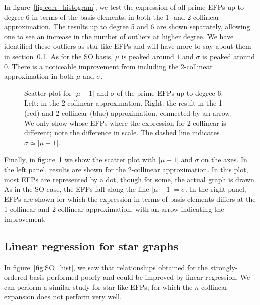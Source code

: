 \documentclass[a4paper,11pt]{article}
\renewcommand{\sec}[1]{section~\ref{sec:#1}}
\newcommand{\fig}[1]{figure~\ref{fig:#1}}
\begin{document}
In \fig{corr_histogram}, we test the expression of all prime EFPs up to degree 6 in terms of the basis elements, in both the 1- and 2-collinear approximation.
     The results up to degree 5 and 6 are shown separately, allowing one to see an increase in the number of outliers at higher degree.
     We have identified these outliers as star-like EFPs and will have more to say about them in \sec{star}.
     As for the SO basis, $\mu$ is peaked around $1$ and $\sigma$ is peaked around 0.
     There is a noticeable improvement from including the 2-collinear approximation in both $\mu$ and $\sigma$.

   \begin{figure}[t]
          \hfill 
\caption{Scatter plot for $|\mu-1|$ and $\sigma$ of the  prime EFPs up to degree 6. Left: in the 2-collinear approximation. Right: the result in the 1- (red) and 2-collinear (blue) approximation, connected by an arrow.  We only show whose EFPs where the expression for 2-collinear is different; note the difference in scale.  The dashed line indicates $\sigma \simeq |\mu-1|$.
\label{fig:2d_scatter}}
     \end{figure}



Finally, in \fig{2d_scatter} we show the scatter plot with $|\mu-1|$ and $\sigma$ on the axes. 
%
In the left panel, results are shown for the 2-collinear approximation.
%
In this plot, most EFPs are represented by a dot, though for some, the actual graph is drawn.
%
As in the SO case, the EFPs fall along the line $|\mu - 1| = \sigma$.
%
In the right panel, EFPs are shown for which the expression in terms of basis elements differs at the 1-collinear and 2-collinear approximation, with an arrow indicating the improvement.


\subsection{Linear regression for star graphs}
\label{sec:star}

In \fig{SO_hist}, we saw that relationships obtained for the strongly-ordered basis performed poorly and could be improved by linear regression.
%
We can perform a similar study for star-like EFPs, for which the $n$-collinear expansion does not perform very well.
\end{document}

